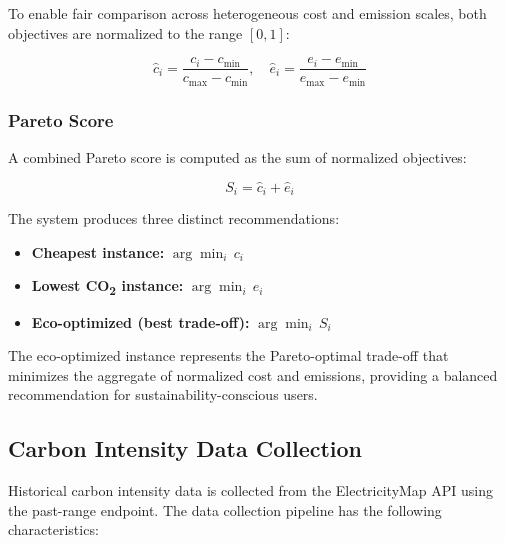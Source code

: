 \documentclass[conference]{IEEEtran}
\begin{document}
To enable fair comparison across heterogeneous cost and emission scales, both objectives are normalized to the range $[0, 1]$:

\begin{equation}
\hat{c}_i = \frac{c_i - c_{\min}}{c_{\max} - c_{\min}}, \quad \hat{e}_i = \frac{e_i - e_{\min}}{e_{\max} - e_{\min}}
\label{eq:normalize}
\end{equation}

\subsubsection{Pareto Score}

A combined Pareto score is computed as the sum of normalized objectives:

\begin{equation}
S_i = \hat{c}_i + \hat{e}_i
\label{eq:pareto_score}
\end{equation}

The system produces three distinct recommendations:
\begin{itemize}
    \item \textbf{Cheapest instance:} $\arg\min_i \, c_i$
    \item \textbf{Lowest CO\textsubscript{2} instance:} $\arg\min_i \, e_i$
    \item \textbf{Eco-optimized (best trade-off):} $\arg\min_i \, S_i$
\end{itemize}

The eco-optimized instance represents the Pareto-optimal trade-off that minimizes the aggregate of normalized cost and emissions, providing a balanced recommendation for sustainability-conscious users.

\subsection{Carbon Intensity Data Collection}

Historical carbon intensity data is collected from the ElectricityMap API \cite{b9} using the past-range endpoint. The data collection pipeline has the following characteristics:
\end{document}
